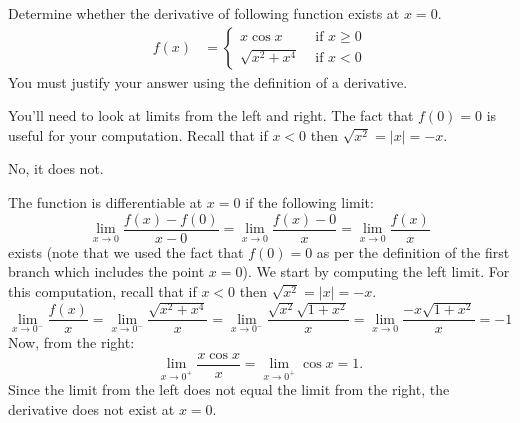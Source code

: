 \begin{Mquestion}[2015Q]
 Determine whether the derivative of following function exists at
$x=0$.
\begin{align*}
f(x) &=\begin{cases}
  x \cos x & \text{ if }  x\ge 0\\
  \sqrt{x^2+x^4} & \text{ if } x< 0
\end{cases}
\end{align*}
You must justify your answer using the definition of a derivative.
\end{Mquestion}
\begin{hint} You'll need to look at limits from the left and right. The fact that $f(0)=0$ is useful for your computation. Recall that if $x<0$ then $\sqrt{x^2}=|x|=-x$.
\end{hint}
\begin{answer} No, it does not.
\end{answer}
\begin{solution}
The function is differentiable at $x=0$ if the following limit:
$$\lim_{x\to 0}\frac{f(x)-f(0)}{x-0} = \lim_{x\to 0}\frac{f(x)-0}{x}=\lim_{x\to
0} \frac{f(x)}{x}$$
exists (note that we used the fact that $f(0)=0$ as per the definition of the
first branch which includes the point $x=0$). We start by computing the left limit. For this computation, recall that if $x<0$ then $\sqrt{x^2}=|x|=-x$.
$$\lim_{x\to 0^-}\frac{f(x)}{x}=\lim_{x\to 0^-}\frac{\sqrt{x^2+x^4}}{x}=\lim_{x\to
0^-} \frac{\sqrt{x^2}\sqrt{1+x^2}}{x}=\lim_{x \rightarrow 0}\frac{-x\sqrt{1+x^2}}{x}=-1$$
Now, from the right:
$$\lim_{x\to 0^+}\frac{x\cos x}{x}=\lim_{x\to
0^+}\cos x = 1.$$
Since the limit from the left does not equal the limit from the right, the derivative does not exist at $x=0$.
\end{solution}


